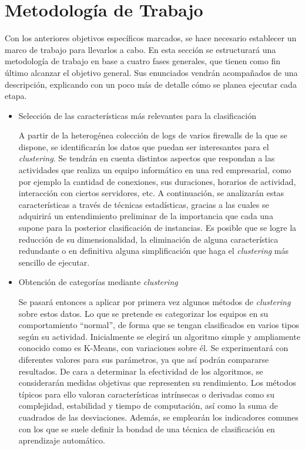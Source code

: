 \section{Metodología de Trabajo}\label{sec:metodologiatrabajo}

Con los anteriores objetivos específicos marcados, se hace necesario establecer un marco de trabajo para llevarlos a cabo.
En esta sección se estructurará una metodología de trabajo en base a cuatro fases generales, que tienen como fin último alcanzar el objetivo general.
Sus enunciados vendrán acompañados de una descripción, explicando con un poco más de detalle cómo se planea ejecutar cada etapa.

\begin{itemize}

    \item Selección de las características más relevantes para la clasificación

A partir de la heterogénea colección de logs de varios firewalls de la que se dispone, se identificarán los datos que puedan ser interesantes para el \emph{clustering}.
Se tendrán en cuenta distintos aspectos que respondan a las actividades que realiza un equipo informático en una red empresarial, como por ejemplo la cantidad de conexiones, sus duraciones, horarios de actividad, interacción con ciertos servidores, etc.
A continuación, se analizarán estas características a través de técnicas estadísticas, gracias a las cuales se adquirirá un entendimiento preliminar de la importancia que cada una supone para la posterior clasificación de instancias.
Es posible que se logre la reducción de su dimensionalidad, la eliminación de alguna característica redundante o en definitiva alguna simplificación que haga el \emph{clustering} más sencillo de ejecutar.

    \item Obtención de categorías mediante \emph{clustering}

Se pasará entonces a aplicar por primera vez algunos métodos de \emph{clustering} sobre estos datos.
Lo que se pretende es categorizar los equipos en su comportamiento ``normal'', de forma que se tengan clasificados en varios tipos según su actividad.
Inicialmente se elegirá un algoritmo simple y ampliamente conocido como es K-Means, con variaciones sobre él.
Se experimentará con diferentes valores para sus parámetros, ya que así podrán compararse resultados.
De cara a determinar la efectividad de los algoritmos, se considerarán medidas objetivas que representen su rendimiento.
Los métodos típicos para ello valoran características intrínsecas o derivadas como su complejidad, estabilidad y tiempo de computación, así como la suma de cuadrados de las desviaciones.
Además, se emplearán los indicadores comunes con los que se suele definir la bondad de una técnica de clasificación en aprendizaje automático.


\end{itemize}
